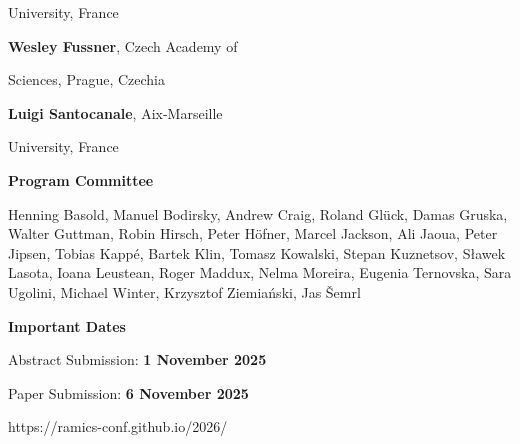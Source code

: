 \documentclass[a3paper, 12pt]{article}
\begin{document}
\begin{minipage}[t]{.43\linewidth}
  \hfill University, France

  \hfill \textbf{Wesley Fussner}, Czech Academy of

  \hfill Sciences, Prague, Czechia

  \hfill \textbf{Luigi Santocanale}, Aix-Marseille

  \hfill University, France

  \bigskip

  \hfill {\Large \bf Program Committee}

  \medskip

Henning Basold,
Manuel Bodirsky,
Andrew Craig,
Roland Glück,
Damas Gruska,
Walter Guttman,
Robin Hirsch,
Peter Höfner,
Marcel Jackson,
Ali Jaoua,
Peter Jipsen,
Tobias Kappé,
Bartek Klin,
Tomasz Kowalski,
Stepan Kuznetsov,
Sławek Lasota,
Ioana Leustean,
Roger Maddux,
Nelma Moreira,
Eugenia Ternovska,
Sara Ugolini,
Michael Winter,
Krzysztof Ziemiański,
Jas Šemrl
  
  \bigskip
  
  \hfill
  {\Large \bf Important Dates}

  \smallskip

  \hfill Abstract Submission: \textbf{1 November 2025}
  
  \hfill Paper Submission: \textbf{6 November 2025}
  


  \vspace{4ex}

  \hspace*{-15ex} {\fontsize{30}{40}\selectfont https://ramics-conf.github.io/2026/}

  \vspace*{-2ex}

\end{minipage}
\end{document}
